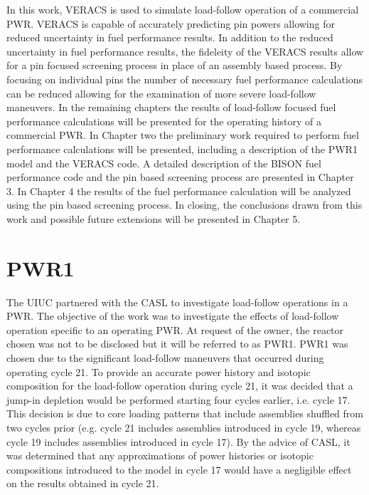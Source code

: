 \documentclass[edeposit,fullpage,11pt]{uiucthesis2009}
\begin{document}
In this work, \gls{VERACS} is used to simulate load-follow operation of a commercial \gls{PWR}.
\gls{VERACS} is capable of accurately predicting pin powers allowing for reduced uncertainty in fuel performance results.
In addition to the reduced uncertainty in fuel performance results, the fideleity of the \gls{VERACS} results allow for a pin focused screening process in place of an assembly based process.
By focusing on individual pins the number of necessary fuel performance calculations can be reduced allowing for the examination of more severe load-follow maneuvers.
In the remaining chapters the results of load-follow focused fuel performance calculations will be presented for the operating history of a commercial \gls{PWR}.
In Chapter two the preliminary work required to perform fuel performance calculations will be presented, including a description of the PWR1 model and the \gls{VERACS} code. 
A detailed description of the BISON fuel performance code and the pin based screening process are presented in Chapter 3.
In Chapter 4 the results of the fuel performance calculation will be analyzed using the pin based screening process.
In closing, the conclusions drawn from this work and possible future extensions will be presented in Chapter 5.


\chapter{PWR1}
The \gls{UIUC} partnered with the \gls{CASL} to investigate load-follow operations in a PWR. 
The objective of the work was to investigate the effects of load-follow operation specific to an operating PWR. 
At request of the owner, the reactor chosen was not to be disclosed but it will be referred to as PWR1.
PWR1 was chosen due to the significant load-follow maneuvers that occurred during operating cycle 21. 
To provide an accurate power history and isotopic composition for the load-follow operation during cycle 21, it was decided that a jump-in depletion would be performed starting four cycles earlier, i.e. cycle 17. 
This decision is due to core loading patterns that include assemblies shuffled from two cycles prior (e.g. cycle 21 includes assemblies introduced in cycle 19, whereas cycle 19 includes assemblies introduced in cycle 17). 
By the advice of \gls{CASL}, it was determined that any approximations of power histories or isotopic compositions introduced to the model in cycle 17 would have a negligible effect on the results obtained in cycle 21.
\end{document}

